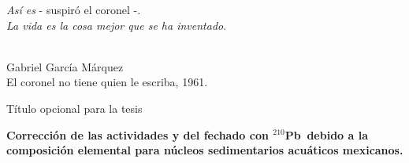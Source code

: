 \documentclass[9pt]{beamer}
\newcommand{\PbCero}{$^{210}$Pb}
\begin{document}
\begin{frame}[noframenumbering]
\begin{flushright}
\guillemotleft \textit{Así es} - suspiró el coronel -. \\ \vspace{0.2cm}
\textit{La vida es la cosa mejor que se ha inventado}. \guillemotright
\begin{footnotesize}
\\ \vspace{0.5cm}
Gabriel García Márquez
\\
El coronel no tiene quien le escriba, 1961.
\end{footnotesize}
\end{flushright}
\vspace{1cm}

\begin{flushright}
\hyperlink{Portada}{}
\end{flushright}
\end{frame}

\begin{frame}[noframenumbering, label=Portada2]{Título opcional para la tesis}
	\begin{center}
	\textbf{Corrección de las actividades y del fechado con \PbCero\, debido a la composición elemental para núcleos sedimentarios acuáticos mexicanos.}
	\end{center}
	\begin{flushright}
	\hyperlink{Portada}{}
	\end{flushright}
\end{frame}
\end{document}
